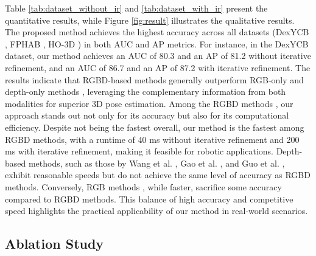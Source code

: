 Table \ref{tab:dataset_without_ir} and \ref{tab:dataset_with_ir} present the quantitative results, while Figure \ref{fig:result} illustrates the qualitative results. The proposed method achieves the highest accuracy across all datasets (DexYCB \cite{chao2021dexycb}, FPHAB \cite{garcia2018first}, HO-3D \cite{hampali2020honnotate}) in both AUC and AP metrics. For instance, in the DexYCB dataset, our method achieves an AUC of 80.3 and an AP of 81.2 without iterative refinement, and an AUC of 86.7 and an AP of 87.2 with iterative refinement. The results indicate that RGBD-based methods generally outperform RGB-only \cite{billings2019silhonet, peng2019pvnet, wang2021gdr, castro2023crt} and depth-only methods \cite{wang20216d, gao20206d, guo2021efficient}, leveraging the complementary information from both modalities for superior 3D pose estimation. Among the RGBD methods \cite{wang2019densefusion, he2020pvn3d, he2021ffb6d, wu2023geometric, hong2024rdpn6d, lin2024hipose}, our approach stands out not only for its accuracy but also for its computational efficiency. Despite not being the fastest overall, our method is the fastest among RGBD methods, with a runtime of 40 ms without iterative refinement and 200 ms with iterative refinement, making it feasible for robotic applications. Depth-based methods, such as those by Wang et al. \cite{wang20216d}, Gao et al. \cite{gao20206d}, and Guo et al. \cite{guo2021efficient}, exhibit reasonable speeds but do not achieve the same level of accuracy as RGBD methods. Conversely, RGB methods \cite{billings2019silhonet, peng2019pvnet, wang2021gdr, castro2023crt}, while faster, sacrifice some accuracy compared to RGBD methods. This balance of high accuracy and competitive speed highlights the practical applicability of our method in real-world scenarios.

\subsection{Ablation Study}

